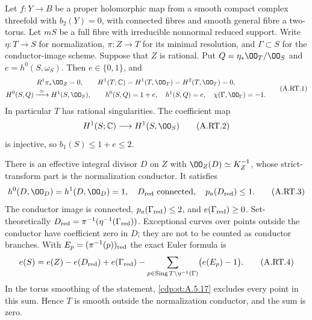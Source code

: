 \begin{proposition}\label{cdp:st:A.5.16}


Let $f:Y\to B$ be a proper holomorphic map from a smooth compact
complex threefold with $b_2(Y)=0$, with connected fibres and smooth
general fibre a two-torus. Let $mS$ be a full fibre with irreducible
nonnormal reduced support. Write $\eta:T\to S$ for normalization,
$\pi:Z\to T$ for its minimal resolution, and $\Gamma\subset S$
for the conductor-image scheme. Suppose that $Z$ is rational.
Put $Q=\eta_*\OO_T/\OO_S$ and $e=h^0(S,\omega_S)$.
Then $e\in\{0,1\}$, and
\[
\begin{gathered}
 R^1\pi_*\OO_Z=0,\qquad
 H^1(T;\mathbb C)=H^1(T,\OO_T)=H^2(T,\OO_T)=0,\\
 H^0(S,Q)\xrightarrow{\ \simeq\ }H^1(S,\OO_S),\qquad
 h^0(S,Q)=1+e,\quad h^1(S,Q)=e,\quad
 \chi(\Gamma,\OO_\Gamma)=-1.
\end{gathered}
\tag{A.RT.1}\label{cdp:eq:A.RT.1}
\]
In particular $T$ has rational singularities. The coefficient map
\[
 H^1(S;\mathbb C)\longrightarrow H^1(S,\OO_S)
\tag{A.RT.2}\label{cdp:eq:A.RT.2}
\]
is injective, so $b_1(S)\le1+e\le2$.

There is an effective integral divisor $D$ on $Z$ with
$\OO_Z(D)\simeq K_Z^{-1}$, whose strict-transform part is the
normalization conductor. It satisfies
\[
 h^0(D,\OO_D)=h^1(D,\OO_D)=1,
 \quad D_{\rm red}\text{ connected},
 \quad p_a(D_{\rm red})\le1.
\tag{A.RT.3}\label{cdp:eq:A.RT.3}
\]
The conductor image is connected,
$p_a(\Gamma_{\rm red})\le2$, and
$e(\Gamma_{\rm red})\ge0$. Set-theoretically
$D_{\rm red}=\pi^{-1}(\eta^{-1}(\Gamma_{\rm red}))$.
Exceptional curves over points outside the conductor have
coefficient zero in $D$; they are not to be counted as conductor
branches. With $E_p=(\pi^{-1}(p))_{\rm red}$ the exact Euler
formula is
\[
 e(S)=e(Z)-e(D_{\rm red})+e(\Gamma_{\rm red})
       -\sum_{p\in\operatorname{Sing}T\setminus\eta^{-1}(\Gamma)}
                  \bigl(e(E_p)-1\bigr).
\tag{A.RT.4}\label{cdp:eq:A.RT.4}
\]
In the torus smoothing of the statement, \ref{cdp:st:A.5.17} excludes
every point in this sum. Hence $T$ is smooth outside the
normalization conductor, and the sum is zero.
\end{proposition}


